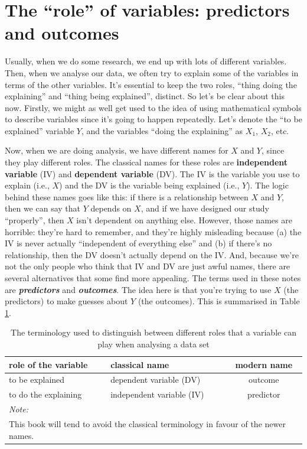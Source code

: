 \documentclass[
  11pt,
]{book}
\theoremstyle{definition}
\theoremstyle{definition}
\theoremstyle{definition}
\theoremstyle{definition}
\theoremstyle{remark}
\begin{document}
\hypertarget{ivdv}{%
\section{The ``role'' of variables: predictors and outcomes}\label{ivdv}}

Usually, when we do some research, we end up with lots of different variables. Then, when we analyse our data, we often try to explain some of the variables in terms of the other variables. It's essential to keep the two roles, ``thing doing the explaining'' and ``thing being explained'', distinct. So let's be clear about this now. Firstly, we might as well get used to the idea of using mathematical symbols to describe variables since it's going to happen repeatedly. Let's denote the ``to be explained'' variable \(Y\), and the variables ``doing the explaining'' as \(X_1\), \(X_2\), etc.

Now, when we are doing analysis, we have different names for \(X\) and \(Y\), since they play different roles. The classical names for these roles are \textbf{independent variable} (IV) and \textbf{dependent variable} (DV). The IV is the variable you use to explain (i.e., \(X\)) and the DV is the variable being explained (i.e., \(Y\)). The logic behind these names goes like this: if there is a relationship between \(X\) and \(Y\), then we can say that \(Y\) depends on \(X\), and if we have designed our study ``properly'', then \(X\) isn't dependent on anything else. However, those names are horrible: they're hard to remember, and they're highly misleading because (a) the IV is never actually ``independent of everything else'' and (b) if there's no relationship, then the DV doesn't actually depend on the IV. And, because we're not the only people who think that IV and DV are just awful names, there are several alternatives that some find more appealing. The terms used in these notes are \textbf{\emph{predictors}} and \textbf{\emph{outcomes}}. The idea here is that you're trying to use \(X\) (the predictors) to make guesses about \(Y\) (the outcomes). This is summarised in Table \ref{tab:ivdvtable}.

\begin{table}[H]

\caption{\label{tab:ivdvtable}The terminology used to distinguish between 
      different roles that a variable can play when analysing a data set}
\centering
\begin{tabular}[t]{llc}
\toprule
role of the variable & classical name & modern name\\
\midrule
to be explained & dependent variable (DV) & outcome\\
to do the explaining & independent variable (IV) & predictor\\
\bottomrule
\multicolumn{3}{l}{\rule{0pt}{1em}\textit{Note: }}\\
\multicolumn{3}{l}{\rule{0pt}{1em}This book will tend to avoid the classical terminology in favour of the newer names.}\\
\end{tabular}
\end{table}
\end{document}
